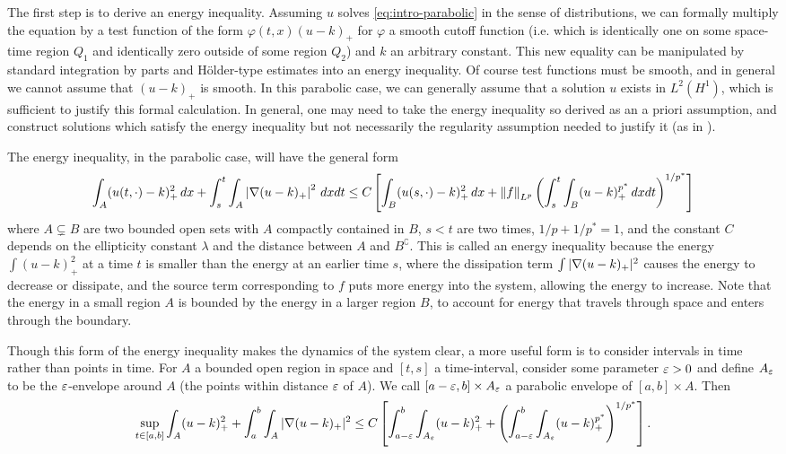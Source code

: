The first step is to derive an energy inequality.  Assuming $u$ solves \eqref{eq:intro-parabolic} in the sense of distributions, we can formally multiply the equation by a test function of the form $\varphi(t,x) (u-k)_+$ for $\varphi$ a smooth cutoff function (i.e. which is identically one on some space-time region $Q_1$ and identically zero outside of some region $Q_2$) and $k$ an arbitrary constant.  This new equality can be manipulated by standard integration by parts and H\"{o}lder-type estimates into an energy inequality.  Of course test functions must be smooth, and in general we cannot assume that $(u-k)_+$ is smooth.  In this parabolic case, we can generally assume that a solution $u$ exists in $L^2(H^1)$, which is sufficient to justify this formal calculation.  In general, one may need to take the energy inequality so derived as an a priori assumption, and construct solutions which satisfy the energy inequality but not necessarily the regularity assumption needed to justify it (as in \cite{StVa.sqg}).  

The energy inequality, in the parabolic case, will have the general form
\[ \int_{A} (u(t,\cdot)-k)_+^2 \,dx + \int_s^t \int_A \left\lvert \nabla (u-k)_+ \right\rvert^2 \,dxdt \leq C \left[ \int_B (u(s,\cdot)-k)_+^2 \,dx + \left\lVert f\right\rVert_{L^p} \left( \int_s^t \int_B (u-k)_+^{p^*} \,dxdt \right)^{1/p^*} \right] \]
where $A \subsetneq B$ are two bounded open sets with $A$ compactly contained in $B$, $s < t$ are two times, $1/p + 1/p^* = 1$, and the constant $C$ depends on the ellipticity constant $\lambda$ and the distance between $A$ and $B^\complement$.  This is called an energy inequality because the energy $\int(u-k)_+^2$ at a time $t$ is smaller than the energy at an earlier time $s$, where the dissipation term $\int |\nabla (u-k)_+|^2$ causes the energy to decrease or dissipate, and the source term corresponding to $f$ puts more energy into the system, allowing the energy to increase.  Note that the energy in a small region $A$ is bounded by the energy in a larger region $B$, to account for energy that travels through space and enters through the boundary.  

Though this form of the energy inequality makes the dynamics of the system clear, a more useful form is to consider intervals in time rather than points in time.  For $A$ a bounded open region in space and $[t,s]$ a time-interval, consider some parameter $\varepsilon > 0$ and define $A_\varepsilon$ to be the $\varepsilon$-envelope around $A$ (the points within distance $\varepsilon$ of $A$).  We call $[a-\varepsilon,b] \times A_\varepsilon$ a parabolic envelope of $[a,b] \times A$.  Then
\begin{equation} \label{intro-energy inequality}
\sup_{t \in [a,b]} \int_A (u-k)_+^2 + \int_a^b \int_A |\nabla (u-k)_+|^2 \leq C \left[  \int_{a-\varepsilon}^b \int_{A_\varepsilon} (u-k)_+^2 + \left( \int_{a-\varepsilon}^b \int_{A_\varepsilon} (u-k)_+^{p^*}  \right)^{1/p^*}  \right]. 
\end{equation}


